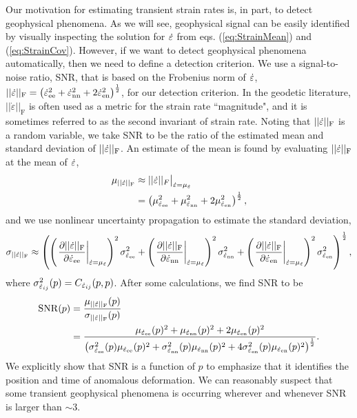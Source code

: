 \documentclass[extra,mreferee]{gji}
\begin{document}
Our motivation for estimating transient strain rates is, in part, to
detect geophysical phenomena. As we will see, geophysical signal can
be easily identified by visually inspecting the solution for $\dot\varepsilon$
from eqs. (\ref{eq:StrainMean}) and (\ref{eq:StrainCov}). However, if
we want to detect geophysical phenomena automatically, then we need to
define a detection criterion. We use a signal-to-noise ratio, SNR,
that is based on the Frobenius norm of $\dot\varepsilon$,
$||\dot\varepsilon||_\mathrm{F} = \left(\dot\varepsilon_{\mathrm{e}\mathrm{e}}^2 + \dot\varepsilon_{\mathrm{n}\mathrm{n}}^2 +
2\dot\varepsilon_{\mathrm{e}\mathrm{n}}^2\right)^{\frac{1}{2}}$, for our detection criterion.
In the geodetic literature, $||\dot{\varepsilon}||_\mathrm{F}$ is
often used as a metric for the strain rate ``magnitude", and it is
sometimes referred to as the second invariant of strain rate. Noting
that $||\dot\varepsilon||_\mathrm{F}$ is a random variable, we take SNR to be
the ratio of the estimated mean and standard deviation of
$||\dot\varepsilon||_\mathrm{F}$. An estimate of the mean is found by
evaluating $||\dot\varepsilon||_\mathrm{F}$ at the mean of $\dot\varepsilon$,
\begin{align}
\mu_{||\dot\varepsilon||_\mathrm{F}} &\approx ||\dot\varepsilon||_F \big|_{\dot\varepsilon = \mu_{\dot\varepsilon}}\nonumber \\
                             &= \left(\mu_{\dot\varepsilon_{\mathrm{e}\mathrm{e}}}^2 + 
                                      \mu_{\dot\varepsilon_{\mathrm{n}\mathrm{n}}}^2 + 
                                      2\mu_{\dot\varepsilon_{\mathrm{e}\mathrm{n}}}^2 \right)^\frac{1}{2},
\end{align}
and we use nonlinear uncertainty propagation to estimate the standard
deviation,
\begin{equation}
\sigma_{||\dot\varepsilon||_\mathrm{F}} \approx
\left( \left(\left. \frac{\partial ||\dot\varepsilon||_\mathrm{F}}{\partial \dot\varepsilon_{\mathrm{e}\mathrm{e}}}\right|_{\dot\varepsilon = \mu_{\dot\varepsilon}} \right)^2 
       \sigma^2_{\dot\varepsilon_{\mathrm{e}\mathrm{e}}} +
       \left(\left. \frac{\partial ||\dot\varepsilon||_\mathrm{F}}{\partial \dot\varepsilon_{\mathrm{n}\mathrm{n}}}\right|_{\dot\varepsilon = \mu_{\dot\varepsilon}} \right)^2
       \sigma^2_{\dot\varepsilon_{\mathrm{n}\mathrm{n}}} +
       \left(\left. \frac{\partial ||\dot\varepsilon||_\mathrm{F}}{\partial \dot\varepsilon_{\mathrm{e}\mathrm{n}}}\right|_{\dot\varepsilon = \mu_{\dot\varepsilon}} \right)^2 
       \sigma^2_{\dot\varepsilon_{\mathrm{e}\mathrm{n}}} \right)^\frac{1}{2},
\end{equation}
where $\sigma^2_{\dot\varepsilon_{ij}}(p) = C_{\dot\varepsilon_{ij}}(p,p)$. After some
calculations, we find SNR to be
\begin{align}\label{eq:SNR}
\mathrm{SNR}(p) &= \frac{\mu_{||\dot\varepsilon||_\mathrm{F}}(p)}{\sigma_{||\dot\varepsilon||_\mathrm{F}}(p)} \\
                &= \frac{\mu_{\dot\varepsilon_{\mathrm{e}\mathrm{e}}}(p)^2 +
                         \mu_{\dot\varepsilon_{\mathrm{n}\mathrm{n}}}(p)^2 +
                         2\mu_{\dot\varepsilon_{\mathrm{e}\mathrm{n}}}(p)^2}
                        {\big(\sigma^2_{\dot\varepsilon_{\mathrm{e}\mathrm{e}}}(p)\mu_{\dot\varepsilon_{\mathrm{e}\mathrm{e}}}(p)^2 + 
                              \sigma^2_{\dot\varepsilon_{\mathrm{n}\mathrm{n}}}(p)\mu_{\dot\varepsilon_{\mathrm{n}\mathrm{n}}}(p)^2 + 
                              4\sigma^2_{\dot\varepsilon_{\mathrm{e}\mathrm{n}}}(p)\mu_{\dot\varepsilon_{\mathrm{e}\mathrm{n}}}(p)^2
                         \big)^{\frac{1}{2}}}.
\end{align}
We explicitly show that SNR is a function of $p$ to emphasize that it
identifies the position and time of anomalous deformation. We can
reasonably suspect that some transient geophysical phenomena is
occurring wherever and whenever SNR is larger than ${\sim}3$.
\end{document}
